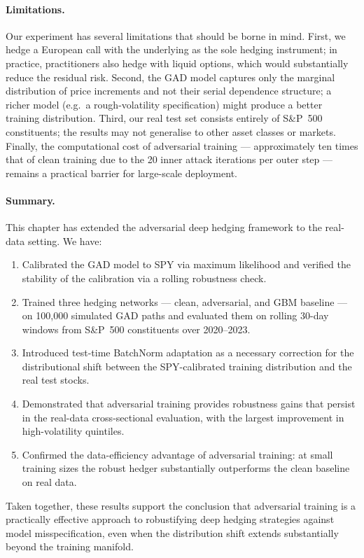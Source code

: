 \paragraph{Limitations.}
Our experiment has several limitations that should be borne in mind.
First, we hedge a European call with the underlying as the sole hedging
instrument; in practice, practitioners also hedge with liquid options, which
would substantially reduce the residual risk.  Second, the GAD model captures
only the marginal distribution of price increments and not their serial
dependence structure; a richer model (e.g.\ a rough-volatility specification)
might produce a better training distribution.  Third, our real test set
consists entirely of S\&P~500 constituents; the results may not generalise to
other asset classes or markets.  Finally, the computational cost of adversarial
training --- approximately ten times that of clean training due to the 20
inner attack iterations per outer step --- remains a practical barrier for
large-scale deployment.

\paragraph{Summary.}
This chapter has extended the adversarial deep hedging framework to the
real-data setting.  We have:
\begin{enumerate}
  \item Calibrated the GAD model to SPY via maximum likelihood and verified
        the stability of the calibration via a rolling robustness check.
  \item Trained three hedging networks --- clean, adversarial, and GBM
        baseline --- on 100{,}000 simulated GAD paths and evaluated them on
        rolling 30-day windows from S\&P~500 constituents over 2020--2023.
  \item Introduced test-time BatchNorm adaptation as a necessary correction
        for the distributional shift between the SPY-calibrated training
        distribution and the real test stocks.
  \item Demonstrated that adversarial training provides robustness gains that
        persist in the real-data cross-sectional evaluation, with the largest
        improvement in high-volatility quintiles.
  \item Confirmed the data-efficiency advantage of adversarial training: at
        small training sizes the robust hedger substantially outperforms the
        clean baseline on real data.
\end{enumerate}
Taken together, these results support the conclusion that adversarial training
is a practically effective approach to robustifying deep hedging strategies
against model misspecification, even when the distribution shift extends
substantially beyond the training manifold.
